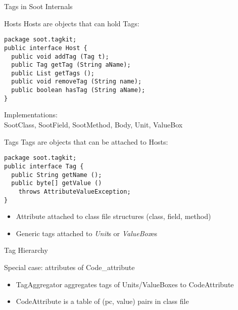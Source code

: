 \begin{slide}{Tags in Soot Internals}
\end{slide}

\begin{slide}{Hosts}
{\red Host}s are objects that can hold {\red Tag}s:
{\small
\begin{verbatim}
package soot.tagkit;
public interface Host {
  public void addTag (Tag t); 
  public Tag getTag (String aName); 
  public List getTags ();
  public void removeTag (String name); 
  public boolean hasTag (String aName); 
}   
\end{verbatim}
}
Implementations:\\
{\small SootClass, SootField, SootMethod, Body, Unit, ValueBox}
\end{slide}

\begin{slide}{Tags}
{\red Tag}s are objects that can be attached to {\red Host}s:
\small{
\begin{verbatim}
package soot.tagkit;
public interface Tag {
  public String getName ();  
  public byte[] getValue () 
    throws AttributeValueException; 
}
\end{verbatim}
}
\begin{itemize}
\item {\red Attribute} attached to class file structures (class, field, method)
\item Generic tags attached to {\em Unit}s or {\em ValueBox}es
\end{itemize}
\end{slide}

\begin{slide}{Tag Hierarchy}
\end{slide}

\begin{slide}{Special case: attributes of Code\_attribute}

\begin{itemize}
\item {\red TagAggregator} aggregates tags of Units/ValueBoxes to {\red CodeAttribute}
\item CodeAttribute is a table of (pc, value) pairs in class file
\end{itemize}
\end{slide}

